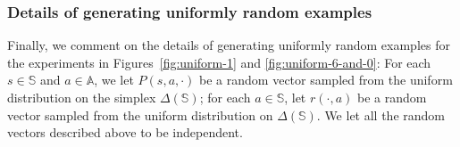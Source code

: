 \documentclass[11pt,letterpaper]{article}
\theoremstyle{plain}
\theoremstyle{definition}
\theoremstyle{remark}
\newcommand{\sspa}{\mathbb{S}}
\newcommand{\aspa}{\mathbb{A}}
\newcommand{\simplex}{\Delta}
\begin{document}
\subsubsection{Details of generating uniformly random examples}

Finally, we comment on the details of generating uniformly random examples for the experiments in Figures~\ref{fig:uniform-1} and \ref{fig:uniform-6-and-0}: 
For each $s\in\sspa$ and $a\in\aspa$, we let $P(s, a, \cdot)$ be a random vector sampled from the uniform distribution on the simplex $\simplex(\sspa)$; for each $a\in\sspa$, let $r(\cdot, a)$ be a random vector sampled from the uniform distribution on $\simplex(\sspa)$. 
We let all the random vectors described above to be independent. 


    
\end{document}
